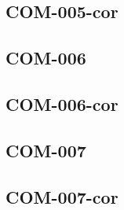 \begin{multicols}{2}
\renewcommand{\xxexo}{COM-005-cor}
\subsection*{\xxexo}
\graphicspath{{../../exos/complexite/\xxexo/}}


\renewcommand{\xxexo}{COM-006}
\subsection*{\xxexo}
\graphicspath{{../../exos/complexite/\xxexo/}}


\renewcommand{\xxexo}{COM-006-cor}
\subsection*{\xxexo}
\graphicspath{{../../exos/complexite/\xxexo/}}


\renewcommand{\xxexo}{COM-007}
\subsection*{\xxexo}
\graphicspath{{../../exos/complexite/\xxexo/}}


\renewcommand{\xxexo}{COM-007-cor}
\subsection*{\xxexo}
\graphicspath{{../../exos/complexite/\xxexo/}}


\end{multicols}



